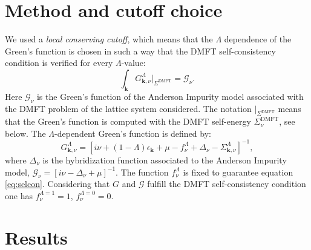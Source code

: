 \documentclass[paper=a4, fontsize=11pt]{scrartcl} %
\numberwithin{equation}{section} %
\numberwithin{figure}{section} %
\numberwithin{table}{section} %
\begin{document}
\section{Method and cutoff choice}
We used a \textit{local conserving cutoff}, which means that the $\Lambda$ dependence of the Green's function is chosen in such a way that the DMFT self-consistency condition is verified for every $\Lambda$-value:
\begin{equation}
\label{eq:selcon}
\int_{\mathbf{k}} G^\Lambda_{\mathbf{k},\nu}|_{\Sigma^{\mathrm{DMFT}}} = \mathcal{G}_{\nu}.   
\end{equation}
Here $\mathcal{G}_{\nu}$ is the Green's function of the Anderson Impurity model associated with the DMFT problem of the lattice system considered. The notation $|_{\Sigma^{\mathrm{DMFT}}}$ means that the Green's function is computed with the DMFT self-energy $\Sigma_\nu^{\mathrm{DMFT}}$, see below. 
The $\Lambda$-dependent Green's function is defined by: 
\begin{equation}
G_{\mathbf{k},\nu}^\Lambda = \left[i\nu+(1-\Lambda)\epsilon_{\mathbf{k}}
+\mu -
f^\Lambda_{\nu}+ \Delta_{\nu} -\Sigma_{\mathbf{k},\nu}^\Lambda
 \right]^{-1},
\end{equation}
where $\Delta_\nu$ is the hybridization function associated to the Anderson Impurity model, $\mathcal{G}_\nu=\left[i\nu-\Delta_\nu+\mu \right]^{-1}$. The function $f^\Lambda_\nu$ is fixed to guarantee equation \ref{eq:selcon}. Considering that $G$ and $\mathcal{G}$ fulfill the DMFT self-consistency condition one has $f^{\Lambda=1}_\nu=1$, $f^{\Lambda=0}_\nu=0$.  

\section{Results}
\end{document}
